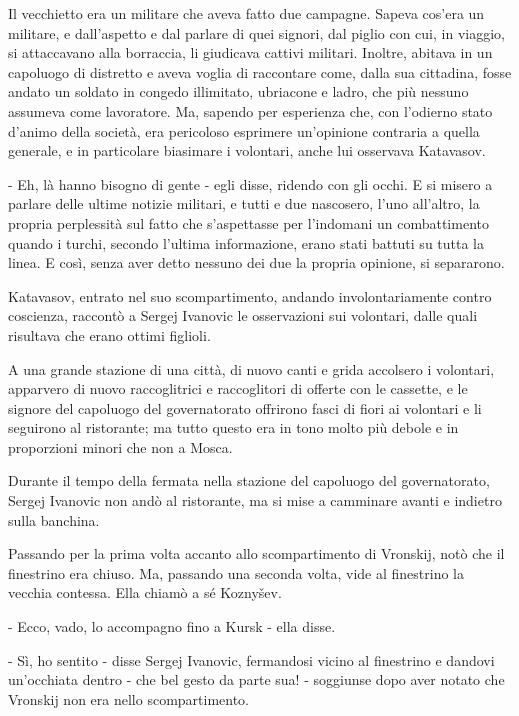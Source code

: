 Il vecchietto era un militare che aveva fatto due campagne. Sapeva cos'era un militare, e dall'aspetto e dal parlare di quei signori, dal piglio con cui, in viaggio, si attaccavano alla borraccia, li giudicava cattivi militari. Inoltre, abitava in un capoluogo di distretto e aveva voglia di raccontare come, dalla sua cittadina, fosse andato un soldato in congedo illimitato, ubriacone e ladro, che più nessuno assumeva come lavoratore. Ma, sapendo per esperienza che, con l'odierno stato d'animo della società, era pericoloso esprimere un'opinione contraria a quella generale, e in particolare biasimare i volontari, anche lui osservava Katavasov. 

- Eh, là hanno bisogno di gente - egli disse, ridendo con gli occhi. E si misero a parlare delle ultime notizie militari, e tutti e due nascosero, l'uno all'altro, la propria perplessità sul fatto che s'aspettasse per l'indomani un combattimento quando i turchi, secondo l'ultima informazione, erano stati battuti su tutta la linea. E così, senza aver detto nessuno dei due la propria opinione, si separarono. 

Katavasov, entrato nel suo scompartimento, andando involontariamente contro coscienza, raccontò a Sergej Ivanovic le osservazioni sui volontari, dalle quali risultava che erano ottimi figlioli. 

A una grande stazione di una città, di nuovo canti e grida accolsero i volontari, apparvero di nuovo raccoglitrici e raccoglitori di offerte con le cassette, e le signore del capoluogo del governatorato offrirono fasci di fiori ai volontari e li seguirono al ristorante; ma tutto questo era in tono molto più debole e in proporzioni minori che non a Mosca. 

\label{iv-7} 

Durante il tempo della fermata nella stazione del capoluogo del governatorato, Sergej Ivanovic non andò al ristorante, ma si mise a camminare avanti e indietro sulla banchina. 

Passando per la prima volta accanto allo scompartimento di Vronskij, notò che il finestrino era chiuso. Ma, passando una seconda volta, vide al finestrino la vecchia contessa. Ella chiamò a sé Koznyšev. 

- Ecco, vado, lo accompagno fino a Kursk - ella disse. 

- Sì, ho sentito - disse Sergej Ivanovic, fermandosi vicino al finestrino e dandovi un'occhiata dentro - che bel gesto da parte sua! - soggiunse dopo aver notato che Vronskij non era nello scompartimento. 

